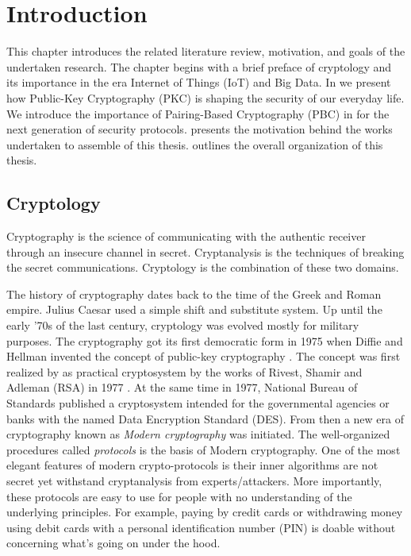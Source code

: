 \chapter{Introduction}
\label{chap:Introduction}
This chapter introduces the related literature review, motivation, and goals of the undertaken research.
The chapter begins with a brief preface of cryptology and its importance in the era Internet of Things (IoT) and Big Data.
In  we present how Public-Key Cryptography (PKC) is shaping the security of our everyday life.
We introduce the importance of Pairing-Based Cryptography (PBC) in  for the next generation of security protocols. 
 presents the motivation behind the works undertaken to assemble of this thesis.
 outlines the overall organization of this thesis.

\section{Cryptology}
\label{chap:sec:crypto}
Cryptography is the science of communicating with the authentic receiver through an insecure channel in secret. 
Cryptanalysis is the techniques of breaking the secret communications.
Cryptology is the combination of these two domains.

The history of cryptography dates back to the time of the Greek and Roman empire.
Julius Caesar used a simple shift and substitute system.
Up until the early '70s of the last century, cryptology was evolved mostly for military purposes. 
The cryptography got its first democratic form in 1975 when Diffie and Hellman invented the concept of public-key cryptography \cite{diffie1976new}. 
The concept was first realized by as practical cryptosystem by the works of Rivest, Shamir and Adleman (RSA) in 1977 \cite{rivest1978method}.
At the same time in 1977, National Bureau of Standards published a cryptosystem intended for the governmental agencies or banks with the named Data Encryption Standard (DES).
From then a new era of cryptography known as \textit{Modern cryptography} was initiated.
The well-organized procedures called \textit{protocols} is the basis of Modern cryptography.
One of the most elegant features of modern crypto-protocols is their inner algorithms are not secret yet withstand cryptanalysis from experts/attackers.
More importantly, these protocols are easy to use for people with no understanding of the underlying principles.
For example, paying by credit cards or withdrawing money using debit cards with a personal identification number (PIN) is doable without concerning what’s going on under the hood. 

